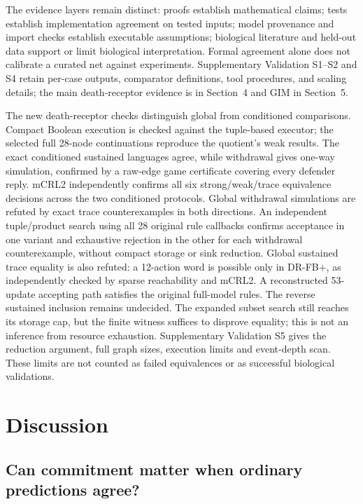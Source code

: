 \documentclass{ws-jbcb}
\numberwithin{equation}{section}
\begin{document}
The evidence layers remain distinct: proofs establish mathematical claims;
tests establish implementation agreement on tested inputs; model provenance
and import checks establish executable assumptions; biological literature and
held-out data support or limit biological interpretation. Formal agreement alone
does not calibrate a curated net against experiments. Supplementary Validation
S1--S2 and S4 retain per-case outputs, comparator definitions, tool procedures,
and scaling details; the main death-receptor evidence is in Section~4 and GIM in Section~5.


The new death-receptor checks distinguish global from conditioned comparisons.
Compact Boolean execution is checked against the tuple-based executor;
the selected full 28-node continuations reproduce the quotient's weak results.
The exact conditioned sustained languages agree, while withdrawal gives one-way
simulation, confirmed by a raw-edge game certificate covering every defender
reply. mCRL2 independently confirms all six strong/weak/trace equivalence
decisions across the two conditioned protocols. Global withdrawal simulations
are refuted by exact trace counterexamples in both directions. An
independent tuple/product search using all 28 original rule callbacks
confirms acceptance in one variant and exhaustive rejection in the other for
each withdrawal counterexample, without compact storage or sink reduction.
Global sustained trace equality is also refuted: a 12-action word is possible
only in DR-FB+, as independently checked by sparse reachability and mCRL2.
A reconstructed 53-update accepting path satisfies the original full-model
rules. The reverse sustained inclusion remains undecided. The expanded
subset search still reaches its storage cap, but the finite witness suffices
to disprove equality; this is not an inference from resource exhaustion.
Supplementary Validation S5 gives the reduction argument, full graph sizes,
execution limits and event-depth scan. These limits are not counted as
failed equivalences or as successful biological validations.

\section{Discussion}\label{sec:discussion}

\subsection{Can commitment matter when ordinary predictions agree?}
\end{document}
